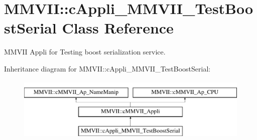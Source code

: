 \hypertarget{classMMVII_1_1cAppli__MMVII__TestBoostSerial}{}\section{M\+M\+V\+II\+:\+:c\+Appli\+\_\+\+M\+M\+V\+I\+I\+\_\+\+Test\+Boost\+Serial Class Reference}
\label{classMMVII_1_1cAppli__MMVII__TestBoostSerial}


M\+M\+V\+II Appli for Testing boost serialization service.  


Inheritance diagram for M\+M\+V\+II\+:\+:c\+Appli\+\_\+\+M\+M\+V\+I\+I\+\_\+\+Test\+Boost\+Serial\+:\begin{figure}[H]
\begin{center}
\leavevmode
\includegraphics[height=3.000000cm]{classMMVII_1_1cAppli__MMVII__TestBoostSerial}
\end{center}
\end{figure}
